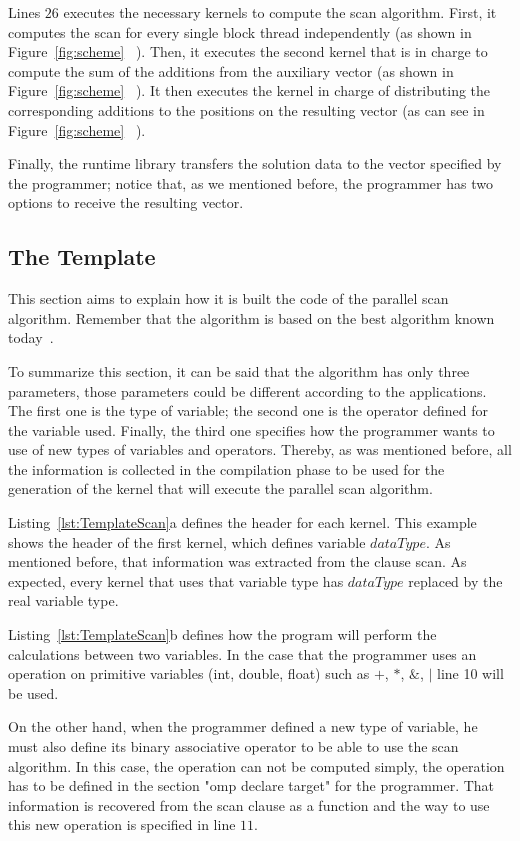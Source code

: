 \documentclass[Ingles]{ic-tese-v1}
\newcommand{\rfig}[1]{Figure~\ref{fig:#1}}
\newcommand{\rlst}[1]{Listing~\ref{lst:#1}}
\begin{document}
Lines $26$ executes the necessary kernels to compute the scan
algorithm. First, it computes the scan for every single block thread
independently (as shown in \rfig{scheme} ~). Then, it executes
the second kernel that is in charge to compute the sum of the additions from the
auxiliary vector (as shown in \rfig{scheme} ~). It then executes
the kernel in charge of distributing the corresponding additions to the
positions on the resulting vector (as can see in \rfig{scheme} ~).

Finally, the runtime library transfers the solution  data to the vector
specified by the programmer; notice that, as we mentioned before,
the programmer has two options to receive the resulting vector.

\subsection{The Template}
\label{sec:template}

This section aims to explain how it is built the code of the parallel scan
algorithm.  Remember that the algorithm is based on the best algorithm known
today~\cite{Sengupta:2007}.

To summarize this section, it can be said that the algorithm has only three
parameters, those parameters could be different according to the applications.
The first one is the  type of variable; the second one is the operator defined
for the variable used. Finally, the third one specifies how the programmer
wants to  use of new types of variables and operators.
Thereby, as was mentioned before, all the information is collected in the
compilation phase to be used for the generation of the kernel that will execute the parallel
scan algorithm.

\rlst{TemplateScan}{a} defines the header for each kernel. This example shows
the header of the first kernel, which
defines  variable $dataType$. As mentioned before, that information was
extracted from the clause scan. As expected, every kernel that uses 
that variable type has  $dataType$  replaced  by the real variable type.

\rlst{TemplateScan}{b} defines how the program will perform the calculations
between two variables. In the case that the programmer uses an operation on primitive  variables (int, double, float) such as $+$, $*$, $\&$, $|$ line 10 will be used.

On the other hand, when the programmer defined a new type of variable, he must
also define its binary associative operator to be able to use the scan
algorithm. In this case, the operation can not be computed simply, the
operation has to be defined in the section "omp declare target" for the
programmer. That information is recovered from the scan clause as a function
and the way to use this new operation is specified in line $11$.
\end{document}
